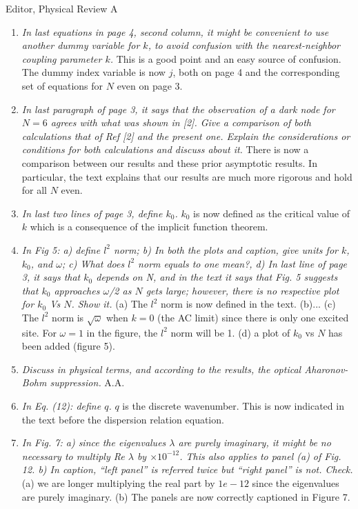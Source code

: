\documentclass[11pt]{letter}
\begin{document}
\begin{letter}{Editor, Physical Review A}
\begin{enumerate}
\item \emph{In last equations in page 4, second column, it might be convenient to use another dummy variable for $k$, to avoid confusion with the nearest-neighbor coupling parameter $k$.} This is a good point and an easy source of confusion. The dummy index variable is now $j$, both on page 4 and the corresponding set of equations for $N$ even on page 3.

\item \emph{In last paragraph of page 3, it says that the observation of a dark node for $N=6$ agrees with what was shown in [2]. Give a comparison of both calculations that of Ref [2] and the present one. Explain the considerations or conditions for both calculations and discuss about it.} There is now a comparison between our results and these prior asymptotic results. In particular, the text explains that our results are much more rigorous and hold for all $N$ even.

\item \emph{In last two lines of page 3, define $k_0$.} $k_0$ is now defined as the critical value of $k$ which is a consequence of the implicit function theorem.

\item \emph{In Fig 5: a) define $l^2$ norm; b) In both the plots and caption, give units for $k$, $k_0$, and $\omega$; c) What does $l^2$ norm equals to one mean?, d) In last line of page 3, it says that $k_0$ depends on N, and in the text it says that Fig. 5 suggests that $k_0$ approaches $\omega$/2 as $N$ gets large; however, there is no respective plot for $k_0$ Vs $N$. Show it.} (a) The $l^2$ norm is now defined in the text. (b)... (c) The $l^2$ norm is $\sqrt{\omega}$ when $k = 0$ (the AC limit) since there is only one excited site. For $\omega = 1$ in the figure, the $l^2$ norm will be 1. (d) a plot of $k_0$ vs $N$ has been added (figure 5).

\item \emph{Discuss in physical terms, and according to the results, the optical Aharonov-Bohm suppression.} A.A.

\item \emph{In Eq. (12): define $q$.} $q$ is the discrete wavenumber. This is now indicated in the text before the dispersion relation equation.

\item \emph{In Fig. 7: a) since the eigenvalues $\lambda$ are purely imaginary, it might be no necessary to multiply Re $\lambda$ by $\times10^{-12}$. This also applies to panel (a) of Fig. 12. b) In caption, ``left panel'' is referred twice but ``right panel'' is not. Check.} (a) we are longer multiplying the real part by $1e-12$ since the eigenvalues are purely imaginary. (b) The panels are now correctly captioned in Figure 7.


\end{enumerate}
\end{letter}
\end{document}
